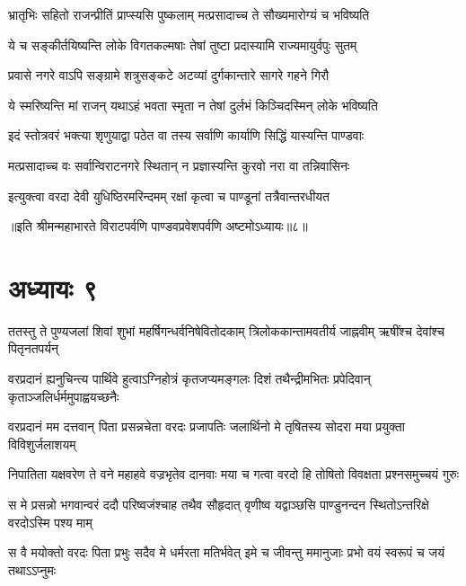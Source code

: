 \twolineshloka
{भ्रातृभिः सहितो राजन्प्रीतिं प्राप्स्यसि पुष्कलाम्}
{मत्प्रसादाच्च ते सौख्यमारोग्यं च भविष्यति}


\twolineshloka
{ये च सङ्कीर्तयिष्यन्ति लोके विगतकल्मषाः}
{तेषां तुष्टा प्रदास्यामि राज्यमायुर्वपुः सुतम्}


\twolineshloka
{प्रवासे नगरे वाऽपि सङ्ग्रामे शत्रुसङ्कटे}
{अटव्यां दुर्गकान्तारे सागरे गहने गिरौ}


\twolineshloka
{ये स्मरिष्यन्ति मां राजन् यथाऽहं भवता स्मृता}
{न तेषां दुर्लभं किञ्चिदस्मिन् लोके भविष्यति}


\twolineshloka
{इदं स्तोत्रवरं भक्त्या शृणुयाद्वा पठेत वा}
{तस्य सर्वाणि कार्याणि सिद्धिं यास्यन्ति पाण्डवाः}


\twolineshloka
{मत्प्रसादाच्च वः सर्वान्विराटनगरे स्थितान्}
{न प्रज्ञास्यन्ति कुरवो नरा वा तन्निवासिनः}


\twolineshloka
{इत्युक्त्वा वरदा देवी युधिष्ठिरमरिन्दमम्}
{रक्षां कृत्वा च पाण्डूनां तत्रैवान्तरधीयत}



॥इति श्रीमन्महाभारते विराटपर्वणि पाण्डवप्रवेशपर्वणि अष्टमोऽध्यायः॥८॥

\chapter{अध्यायः ९}

\fourlineindentedshloka
{ततस्तु ते पुण्यजलां शिवां शुभां}
{महर्षिगन्धर्वनिषेवितोदकाम्}
{त्रिलोककान्तामवतीर्य जाह्नवीम्}
{ऋषींश्च देवांश्च पितृनतपर्यन्}


\fourlineindentedshloka
{वरप्रदानं ह्यनुचिन्त्य पार्थिवे}
{हुत्वाऽग्निहोत्रं कृतजप्यमङ्गलः}
{दिशं तथैन्द्रीमभितः प्रपेदिवान्}
{कृताञ्जलिर्धर्ममुपाह्वयच्छनैः}




\fourlineindentedshloka
{वरप्रदानं मम दत्तवान् पिता}
{प्रसन्नचेता वरदः प्रजापतिः}
{जलार्थिनो मे तृषितस्य सोदरा}
{मया प्रयुक्ता विविशुर्जलाशयम्}


\fourlineindentedshloka
{निपातिता यक्षवरेण ते वने}
{महाहवे वज्रभृतेव दानवाः}
{मया च गत्वा वरदो हि तोषितो}
{विवक्षता प्रश्नसमुच्चयं गुरुः}


\fourlineindentedshloka
{स मे प्रसन्नो भगवान्वरं ददौ}
{परिष्वजंश्चाह तथैव सौहृदात्}
{वृणीष्व यद्वाञ्छसि पाण्डुनन्दन}
{स्थितोऽन्तरिक्षे वरदोऽस्मि पश्य माम्}


\fourlineindentedshloka
{स वै मयोक्तो वरदः पिता प्रभुः}
{सदैव मे धर्मरता मतिर्भवेत्}
{इमे च जीवन्तु ममानुजाः प्रभो}
{वयं स्वरूपं च जयं तथाऽऽप्नुमः}


